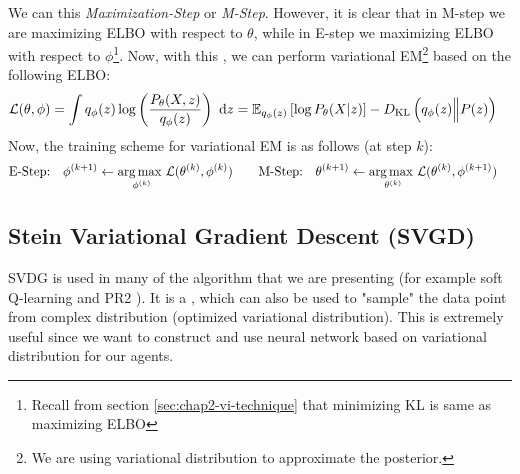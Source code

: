 We can this \textit{Maximization-Step} or \textit{M-Step}. However, it is clear that in M-step we are maximizing ELBO with respect to $\theta$, while in E-step we maximizing ELBO with respect to $\phi$\footnote{Recall from section \ref{sec:chap2-vi-technique} that minimizing KL is same as maximizing ELBO}. Now, with this , we can perform variational EM\footnote{We are using variational distribution to approximate the posterior.} based on the following ELBO:
\begin{equation}
    \begin{aligned}
        \mathcal{L}(\theta, \phi) &= \int q_{\phi}(z) \log \left( \frac{P_{\theta}(X, z)}{q_{\phi}(z)} \right) \ \mathrm{d} z
        = \mathbb{E}_{q_{\phi}(z)} \left[ \log P_{\theta}(X | z) \right] - D_{\mathrm{KL}}\left( q_{\phi}(z) \Big\| P(z) \right)
    \end{aligned}
\end{equation}
Now, the training scheme for variational EM is as follows (at step $k$):
\begin{equation}
    \begin{aligned}
        &\text{E-Step:} \quad \phi^{(k+1)} \leftarrow \underset{\phi^{(k)}}{\arg\max \ }\mathcal{L}(\theta^{(k)}, \phi^{(k)}) \qquad \text{M-Step:} \quad \theta^{(k+1)} \leftarrow \underset{\theta^{(k)}}{\arg\max \ }\mathcal{L}(\theta^{(k)}, \phi^{(k+1)})
    \end{aligned}
\end{equation}

\subsection{Stein Variational Gradient Descent (SVGD) \cite{liu2016stein}}
\label{sec:chap2-svgd}
SVDG is used in many of the algorithm that we are presenting (for example soft Q-learning \cite{haarnoja2017reinforcement} and PR2 \cite{wen2019probabilistic}). It is a  \cite{liu2016stein}, which can also be used to "sample" the data point from complex distribution (optimized variational distribution). This is extremely useful since we want to construct and use neural network based on variational distribution for our agents.


